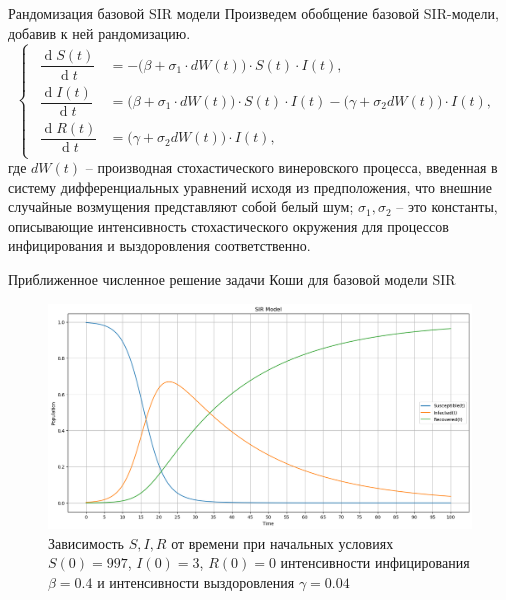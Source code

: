 \documentclass[notheorems]{beamer}
\renewcommand{\d}{\operatorname{d}}
\begin{document}

\begin{frame}
	{Рандомизация базовой SIR модели}
	Произведем обобщение базовой SIR-модели, добавив к ней рандомизацию.
	\begin{equation}
		\left\{ 
		\begin{gathered} 
			\begin{aligned}
				\dfrac {\d S(t)}{\d t} &= -\Big(\beta +\sigma_1 \cdot dW(t)\Big)\cdot S(t)\cdot I(t) ,\\
				\dfrac{\d I(t)}{\d t} &= \Big(\beta +\sigma_1 \cdot dW(t)\Big) \cdot S(t)\cdot I(t) - \Big(\gamma + \sigma_2d W(t)\Big)\cdot I(t),\\
				\dfrac{\d R(t)}{\d t} &= \Big(\gamma + \sigma_2d W(t)\Big)\cdot I(t),
			\end{aligned}
		\end{gathered} 
		\right.		
	\end{equation}
	где $dW (t)$ – производная стохастического винеровского процесса, введенная
	в систему дифференциальных уравнений исходя из предположения, что внешние
	случайные возмущения представляют собой белый шум; $\sigma_1, \sigma_2$ -- это константы, описывающие интенсивность стохастического окружения для процессов инфицирования
	и выздоровления соответственно. 
\end{frame}


\begin{frame}
	{Приближенное численное решение задачи Коши для базовой модели SIR}
	\begin{figure}[h]
		\centering
		\includegraphics[scale=0.3]{images/img01}
		\caption{Зависимость $S, I, R$ от времени при начальных условиях $S(0) = 997$, $I(0) = 3$, $R(0) = 0$
			интенсивности инфицирования $\beta = 0.4$ и интенсивности выздоровления $\gamma = 0.04$}
		\label{fig:img01}
	\end{figure}
\end{frame}
\end{document}
